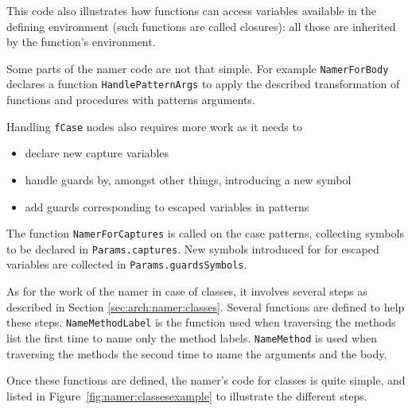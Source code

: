 \documentclass[a4paper]{memoir}
\begin{document}
This code also illustrates how functions can access variables
available in the defining environment (such functions are called closures): all
those are inherited by the function's environment.

Some parts of the namer code are not that simple. For example \lstinline!NamerForBody! 
declares a function \lstinline!HandlePatternArgs!
to apply the described transformation of functions and procedures with patterns
arguments. 

Handling \lstinline!fCase! nodes also requires more work as it needs to 
\begin{itemize}
  \item declare new capture variables
  \item handle guards by, amongst other things, introducing a new symbol
  \item add guards corresponding to escaped variables in patterns
\end{itemize}
The function \lstinline!NamerForCaptures! is called on the case patterns, collecting symbols
to be declared in \lstinline!Params.captures!.
New symbols introduced for for escaped variables are collected in
\lstinline!Params.guardsSymbols!. 

As for the work of the namer in case of classes, it involves several steps as described
in Section \ref{sec:arch:namer:classes}.
Several functions are defined to help these steps. \lstinline!NameMethodLabel!
is the function used when traversing the methods list the first time to name
only the method labels.
\lstinline!NameMethod! is used when traversing the methods the second time to
name the arguments and the body.

Once these functions are defined, the namer's code for classes is quite simple,
and listed in Figure~\ref{fig:namer:classesexample} to illustrate the different steps.
\end{document}
